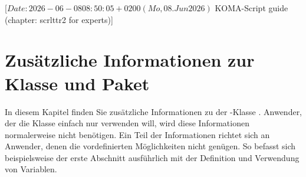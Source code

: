 %
%
%
%
%
%
%

%
                 [$Date: 2026-06-08 08:50:05 +0200 (Mo, 08. Jun 2026) $
                  KOMA-Script guide (chapter: scrlttr2 for experts)]

\chapter{Zusätzliche Informationen zur
  Klasse  und Paket }

\BeginIndexGroup%
%
In diesem Kapitel finden Sie zusätzliche Informationen zu der
\KOMAScript-Klasse . %
Anwender, der die Klasse einfach nur verwenden will, wird diese Informationen
normalerweise nicht benötigen. Ein Teil der Informationen richtet sich an
Anwender, denen die vordefinierten Möglichkeiten nicht genügen. So
befasst sich beispielsweise der erste Abschnitt ausführlich mit der Definition
und Verwendung von Variablen.%

